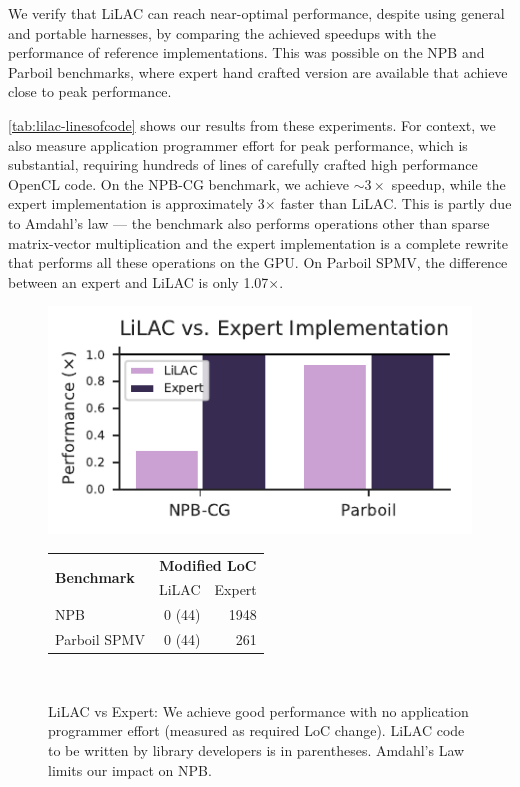 We verify that LiLAC can reach near-optimal performance, despite using general
and portable harnesses, by comparing the achieved speedups with the performance
of reference implementations.
This was possible on the NPB and Parboil benchmarks, where expert hand
crafted version are available that achieve close to peak performance.

\autoref{tab:lilac-linesofcode} shows our results from these experiments.
For context, we also measure application programmer effort for peak performance,
which is substantial, requiring hundreds of lines of carefully crafted
high performance OpenCL code.
On the NPB-CG benchmark, we achieve $\sim 3\times$ speedup,
while the expert implementation is approximately 3$\times$ faster than LiLAC.
This is partly due to Amdahl's law --- the benchmark also performs operations
other than sparse matrix-vector multiplication and the expert implementation is
a complete rewrite that performs all these operations on the GPU.
On Parboil SPMV, the difference between an expert and LiLAC is only
1.07$\times$.

\begin{figure}[t]
  \centering
  \includegraphics[width=0.9\columnwidth,height=0.5\columnwidth]{figures/expert.pdf}
\\[0.5em]
  \begin{tabular}{lrr}
    \multirow{2}{*}{\textbf{Benchmark}} & \multicolumn{2}{c}{\textbf{Modified LoC}} \\
    & LiLAC & Expert \\
    \toprule
    \toprule
    NPB          & 0 (44) & 1948 \\
    Parboil SPMV & 0 (44) & 261
  \end{tabular}
\\[0.45em]
  \caption{LiLAC vs Expert: We achieve good performance with no application
           programmer effort (measured as required LoC change).
           LiLAC code to be written by library developers is in parentheses.
           Amdahl's Law limits our impact on NPB.
}
  \label{tab:lilac-linesofcode}
\end{figure}


